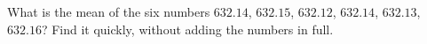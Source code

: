 What is the mean of the six numbers $632.14$, $632.15$, $632.12$, $632.14$, $632.13$, $632.16$? Find it quickly, without adding the numbers in full.
